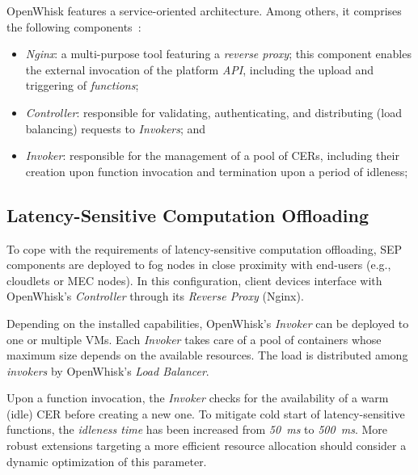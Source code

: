 OpenWhisk features a service-oriented architecture.
Among others, it comprises the following components~\cite{OpenWhisk}:

\begin{itemize}

    \item \textit{Nginx}: a multi-purpose tool featuring a \textit{reverse proxy}; this component enables the external invocation of the platform \textit{API}, including the upload and triggering of \textit{functions};
    
    \item \textit{Controller}: responsible for validating, authenticating, and distributing (load balancing) requests to \textit{Invokers}; and 
    
    \item \textit{Invoker}: responsible for the management of a pool of CERs, including their creation upon function invocation and termination upon a period of idleness;
    
    
    
\end{itemize}

\subsection{Latency-Sensitive Computation Offloading}

To cope with the requirements of latency-sensitive computation offloading, SEP components are deployed to fog nodes in close proximity with end-users
(e.g., cloudlets or MEC nodes). In this configuration, client devices interface with  OpenWhisk's \textit{Controller} through its \textit{Reverse Proxy} (Nginx).



Depending on the installed capabilities, OpenWhisk's \textit{Invoker} can be deployed to one or multiple VMs. Each \textit{Invoker} takes care of a pool of containers whose maximum size depends on the available resources. The load is distributed among \textit{invokers} by OpenWhisk's \textit{Load Balancer}.

Upon a function invocation, the \textit{Invoker} checks for the availability of a warm (idle) CER before creating a new one. To mitigate cold start of latency-sensitive functions, the \textit{idleness time} has been increased from \textit{50~ms} to \textit{500~ms}. More robust extensions targeting a more efficient resource allocation should consider a dynamic optimization of this parameter.

